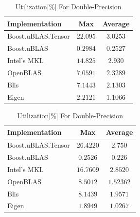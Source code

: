 \begin{table}[ht]
    \centering
    \caption{Utilization[\%] For Single-Precision}
    \begin{tabular}{|l|c|c|}
        \hline
        \textbf{Implementation} & \textbf{Max} & \textbf{Average}\\
        \hline
        Boost.uBLAS.Tensor  & $22.095$& $3.0253$ \\
        \hline
        Boost.uBLAS         & $0.2984$& $0.2527$ \\
        \hline
        Intel's MKL         & $14.825$& $2.930$ \\
        \hline
        OpenBLAS            & $7.0591$& $2.3289$ \\
        \hline
        Blis                & $7.1443$& $2.1303$ \\
        \hline
        Eigen               & $2.2121$& $1.1066$ \\
        \hline
    \end{tabular}

    \vspace*{1 cm}

    \centering
    \caption{Utilization[\%] For Double-Precision}
    \begin{tabular}{|l|c|c|}
        \hline
        \textbf{Implementation} & \textbf{Max} & \textbf{Average}\\
        \hline
        Boost.uBLAS.Tensor  & $26.4220$& $2.750$ \\
        \hline
        Boost.uBLAS         & $0.2526$& $0.226$ \\
        \hline
        Intel's MKL         & $16.7609$& $2.8520$ \\
        \hline
        OpenBLAS            & $8.5012$& $1.52362$ \\
        \hline
        Blis                & $8.1439$& $1.9571$ \\
        \hline
        Eigen               & $1.8949$& $1.0267$ \\
        \hline
    \end{tabular}
\end{table}

